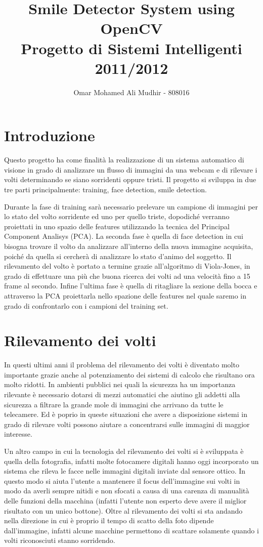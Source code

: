 \documentclass{article}
\author{Omar Mohamed Ali Mudhir - 808016}
\title{Smile Detector System using OpenCV\\\small{Progetto di Sistemi Intelligenti 2011/2012}}
\begin{document}
\maketitle
\tableofcontents
\pagebreak

\section{Introduzione}
Questo progetto ha come finalità la realizzazione di un sistema automatico di visione in grado di analizzare un flusso di immagini da una webcam e di rilevare i volti determinando se siano sorridenti oppure tristi. Il progetto si sviluppa in due tre parti principalmente: training, face detection, smile detection.

Durante la fase di training sarà necessario prelevare un campione di immagini per lo stato del volto sorridente ed uno per quello triste, dopodiché verranno proiettati in uno spazio delle features utilizzando la tecnica del Principal Component Analisys (PCA). La seconda fase è quella di face detection in cui bisogna trovare il volto da analizzare all'interno della nuova immagine acquisita, poiché da quella si cercherà di analizzare lo stato d'animo del soggetto. Il rilevamento del volto è portato a termine grazie all'algoritmo di Viola-Jones\cite{conf/iccv/ViolaJ01}, in grado di effettuare una più che buona ricerca dei volti ad una velocità fino a 15 frame al secondo. Infine l'ultima fase è quella di ritagliare la sezione della bocca e attraverso la PCA proiettarla nello spazione delle features nel quale saremo in grado di confrontarlo con i campioni del training set.

\section{Rilevamento dei volti}
In questi ultimi anni il problema del rilevamento dei volti è diventato molto importante grazie anche al potenziamento dei sistemi di calcolo che risultano ora molto ridotti. In ambienti pubblici nei quali la sicurezza ha un importanza rilevante è necessario dotarsi di mezzi automatici che aiutino gli addetti alla sicurezza a filtrare la grande mole di immagini che arrivano da tutte le telecamere. Ed è poprio in queste situazioni che avere a disposizione sistemi in grado di rilevare volti possono aiutare a concentrarsi sulle immagini di maggior interesse.

Un altro campo in cui la tecnologia del rilevamento dei volti si è sviluppata è quella della fotografia, infatti molte fotocamere digitali hanno oggi incorporato un sistema che rileva le facce nelle immagini digitali inviate dal sensore ottico. In questo modo si aiuta l'utente a mantenere il focus dell'immagine sui volti in modo da averli sempre nitidi e non sfocati a causa di una carenza di manualità delle funzioni della macchina (infatti l'utente non esperto deve avere il miglior risultato con un unico bottone). Oltre al rilevamento dei volti si sta andando nella direzione in cui è proprio il tempo di scatto della foto dipende dall'immagine, infatti alcune macchine permettono di scattare solamente quando i volti riconosciuti stanno sorridendo.
\end{document}
